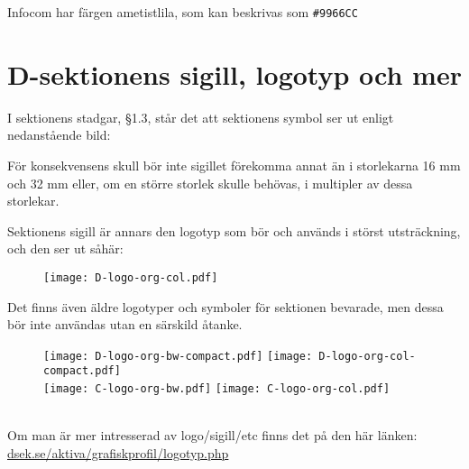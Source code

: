 \documentclass[]{dsekkallelse}
\begin{document}
Infocom har färgen ametistlila, som kan beskrivas som \texttt{\#9966CC}



\section{D-sektionens sigill, logotyp och mer}
I sektionens stadgar, §1.3, står det att sektionens symbol ser ut enligt nedanstående bild:
\begin{figure} [!hbp]
    \centering
    \Dsymbol[32mm]
\end{figure}

För konsekvensens skull bör inte sigillet förekomma annat än i storlekarna 16 mm och 32 mm eller, om en större storlek skulle behövas, i multipler av dessa storlekar.

Sektionens sigill är annars den logotyp som bör och används i störst utsträckning, och den ser ut såhär:
\begin{figure}[!hbp]
    \centering
    \Dlogo[32mm] \texttt{[image: D-logo-org-col.pdf]}
    \label{fig:my_label}
\end{figure}

Det finns även äldre logotyper och symboler för sektionen bevarade, men dessa bör inte användas utan en särskild åtanke.
\begin{figure}[!hbp]
    \centering
    \texttt{[image: D-logo-org-bw-compact.pdf]} \texttt{[image: D-logo-org-col-compact.pdf]} \\
    \texttt{[image: C-logo-org-bw.pdf]} \texttt{[image: C-logo-org-col.pdf]}
    \label{fig:my_label}
\end{figure}
\\
Om man är mer intresserad av logo/sigill/etc finns det på den här länken: \\
\href{https://www.dsek.se/aktiva/grafiskprofil/logotyp.php}{dsek.se/aktiva/grafiskprofil/logotyp.php}


\end{document}
